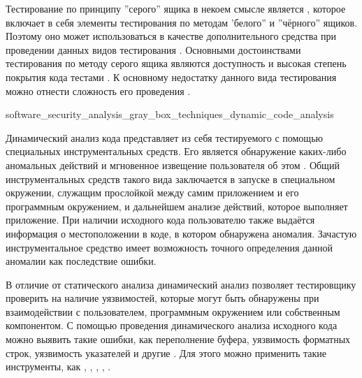 %
Тестирование по принципу ''серого'' ящика в некоем смысле является , которое включает в себя элементы тестирования по методам 'белого'' и ''чёрного'' ящиков. 
%
Поэтому оно может использоваться в качестве дополнительного средства при проведении данных видов тестирования . 
%
Основными достоинствами тестирования по методу серого ящика являются доступность и высокая степень покрытия кода тестами . 
%
К основному недостатку данного вида тестирования можно отнести сложность его проведения .


	{software_security_analysis_gray_box_techniques_dynamic_code_analysis}

%
Динамический анализ кода представляет из себя  тестируемого  с помощью специальных инструментальных средств. 
%
Его  является  обнаружение каких-либо аномальных действий и мгновенное извещение пользователя об этом . 
%
Общий  инструментальных средств такого вида заключается в запуске  в специальном окружении, служащим прослойкой между самим приложением и его программным окружением, и дальнейшем анализе действий, которое выполняет приложение. 
%
При наличии исходного кода пользователю также выдаётся информация о местоположении в коде, в котором обнаружена аномалия. 
%
Зачастую инструментальное средство имеет возможность точного определения данной аномалии как последствие ошибки.

В отличие от статического анализа динамический анализ позволяет тестировщику проверить  на наличие уязвимостей, которые могут быть обнаружены при взаимодействии с пользователем, программным окружением или собственным компонентом. 
%
С помощью проведения динамического анализа исходного кода можно выявить такие ошибки, как переполнение буфера, уязвимость форматных строк, уязвимость указателей и другие . 
%
Для этого можно применить такие инструменты, как  ,  ,  ,  ,  .

